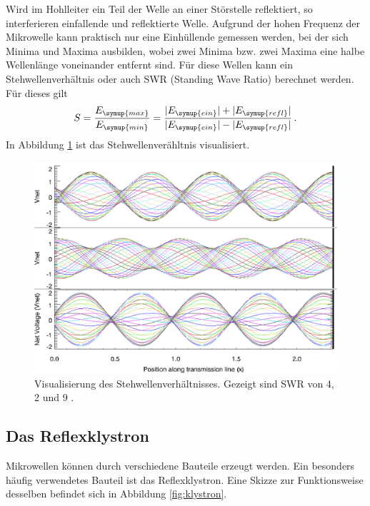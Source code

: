 Wird im Hohlleiter ein Teil der Welle an einer Störstelle reflektiert, so interferieren
einfallende und reflektierte Welle. Aufgrund der hohen Frequenz der Mikrowelle kann praktisch nur eine
Einhüllende gemessen werden, bei der sich Minima und Maxima ausbilden,
wobei zwei Minima bzw. zwei Maxima eine halbe Wellenlänge voneinander entfernt
sind. Für diese Wellen kann ein Stehwellenverhältnis oder auch SWR (Standing Wave
Ratio) berechnet werden. Für dieses gilt
\begin{equation}
  S=\frac{E_{\symup{max}}}{E_{\symup{min}}}=\frac{|E_{\symup{ein}}|+|E_{\symup{refl}}|}
  {|E_{\symup{ein}}|-|E_{\symup{refl}}|}\,.
\end{equation}
In Abbildung \ref{fig:swr} ist das Stehwellenverähltnis visualisiert.
\begin{figure}
  \centering
  \includegraphics[width=\textwidth]{data/swr.png}
  \caption{Visualisierung des Stehwellenverhältnisses. Gezeigt sind SWR von 4, 2 und 9 \cite{wiki}.}
  \label{fig:swr}
\end{figure}



\subsection{Das Reflexklystron}
\label{subsec:klystron}
Mikrowellen können durch verschiedene Bauteile erzeugt werden. Ein besonders häufig
verwendetes Bauteil ist das Reflexklystron. Eine Skizze zur Funktionsweise desselben
befindet sich in Abbildung \ref{fig:klystron}.


